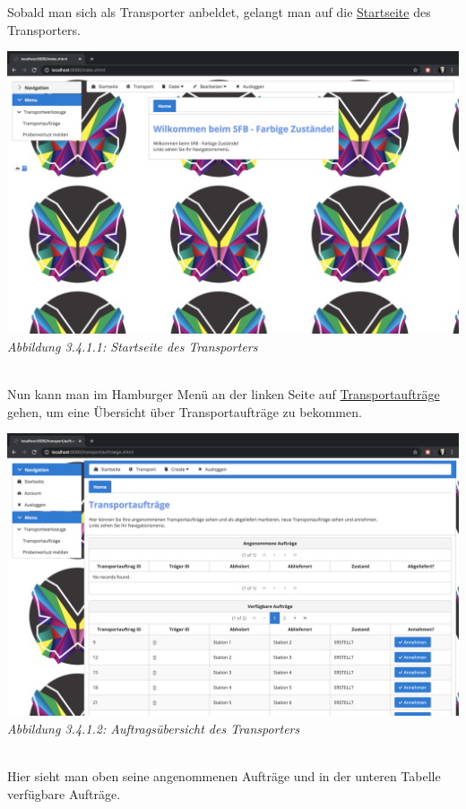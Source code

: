 \documentclass[enabledeprecatedfontcommands,fontsize=12pt,paper=a4,twoside]{scrartcl}
\begin{document}
Sobald man sich als Transporter anbeldet, gelangt man auf die \hyperlink{sc3.4.1.1}{Startseite} des Transporters. 

\hypertarget{sc3.4.1.1}{
\includegraphics[width=1\textwidth]{Screenshots/3411.png}
\textit{Abbildung 3.4.1.1: Startseite des Transporters}
} \\

Nun kann man im Hamburger Menü an der linken Seite auf \hyperlink{sc3.4.1.2}{Transportaufträge} gehen, um eine Übersicht über Transportaufträge zu bekommen.

\hypertarget{sc3.4.1.2}{
\includegraphics[width=1\textwidth]{Screenshots/3412.png}
\textit{Abbildung 3.4.1.2: Auftragsübersicht des Transporters}
} \\

Hier sieht man oben seine angenommenen Aufträge und in der unteren Tabelle verfügbare Aufträge. 




\end{document}
